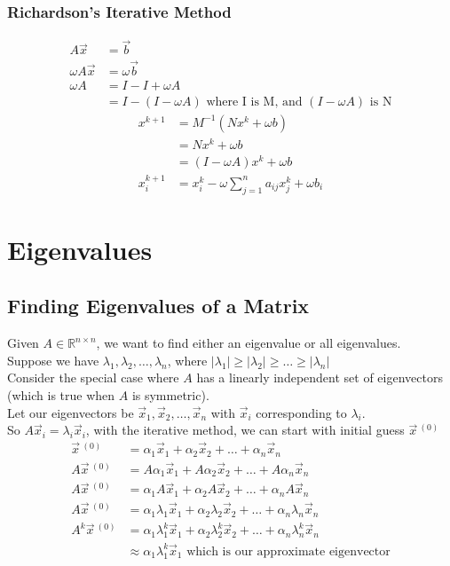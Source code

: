 \documentclass[12pt, letterpaper]{article}
\begin{document}
\subsubsection{Richardson's Iterative Method}
\begin{align*}
    A\vec x &= \vec b\\
    \omega A\vec x &= \omega \vec b \\
    \omega A &= I-I+\omega A \\
    &= I-(I-\omega A) \text{ where I is M, and }(I-\omega A) \text{ is N} 
\end{align*}
\begin{align*}
    x^{k+1}&=M^{-1}(Nx^k+\omega b) \\
    &=Nx^k +\omega b \\
    &=(I-\omega A)x^k+\omega b \\
    x^{k+1}_i &= x_i^k - \omega\displaystyle \sum_{j=1}^{n}a_{ij}x_j^k + \omega b_i
\end{align*}

\section{Eigenvalues}
\subsection{Finding Eigenvalues of a Matrix}
Given $A\in \mathbb{R}^{n\times n}$, we want to find either an eigenvalue or all eigenvalues. \\

\noindent Suppose we have $\lambda_1,\lambda_2,\ldots,\lambda_n$, where $|\lambda_1|\ge|\lambda_2|\ge\ldots\ge|\lambda_n|$ \\

\noindent Consider the special case where $A$ has a linearly independent set of eigenvectors (which is true when $A$ is symmetric). \\ 

\noindent Let our eigenvectors be $\vec x_1, \vec x_2, \ldots, \vec x_n$ with $\vec x_i$ corresponding to $\lambda_i$. \\ 

\noindent So $A\vec x_i = \lambda_i \vec x_i$, with the iterative method, we can start with initial guess $\vec x\,^{(0)}$
\begin{align*}
    \vec x\,^{(0)} &= \alpha_1\vec x_1 + \alpha_2\vec x_2 + \ldots + \alpha_n\vec x_n \\
    A\vec x\,^{(0)} &= A\alpha_1\vec x_1 + A\alpha_2\vec x_2 + \ldots + A\alpha_n\vec x_n \\
    A\vec x\,^{(0)} &= \alpha_1A\vec x_1 + \alpha_2A\vec x_2 + \ldots + \alpha_nA\vec x_n \\
    A\vec x\,^{(0)} &= \alpha_1\lambda_1\vec x_1 + \alpha_2\lambda_2\vec x_2 + \ldots + \alpha_n\lambda_n\vec x_n \\
    A^k\vec x\,^{(0)} &= \alpha_1\lambda_1^k\vec x_1 + \alpha_2\lambda_2^k\vec x_2 + \ldots + \alpha_n\lambda_n^k\vec x_n \\
    &\approx \alpha_1\lambda_1^k \vec x_1 \text{ which is our approximate eigenvector}
\end{align*}
\end{document}

